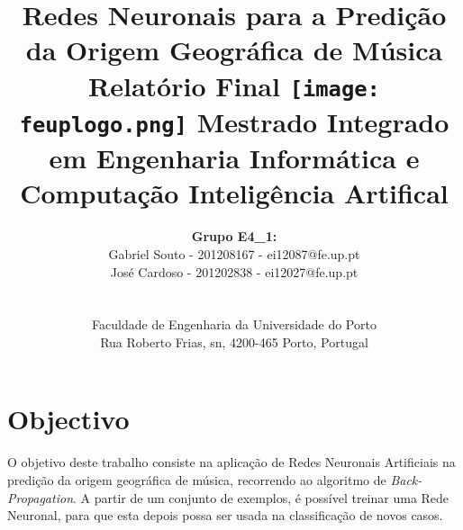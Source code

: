 \documentclass[a4paper]{article}
\begin{document}
\setlength{\textwidth}{16cm}
\setlength{\textheight}{22cm}

\title{\Huge\textbf{Redes Neuronais para a Predição da Origem Geográfica de Música}\linebreak\linebreak\linebreak
\Large\textbf{Relatório Final}\linebreak\linebreak
\linebreak\linebreak
\texttt{[image: feuplogo.png]}\linebreak\linebreak
\linebreak
\Large{Mestrado Integrado em Engenharia Informática e Computação} \linebreak\linebreak
\Large{Inteligência Artifical}\linebreak
}

\author{\textbf{Grupo E4\_1:}\\ Gabriel Souto - 201208167 - ei12087@fe.up.pt \\ José Cardoso - 201202838 - ei12027@fe.up.pt \\\linebreak\linebreak \\
 \\ Faculdade de Engenharia da Universidade do Porto \\ Rua Roberto Frias, s\/n, 4200-465 Porto, Portugal }
\pagebreak


\maketitle
\thispagestyle{empty}


\newpage

\section{Objectivo}

O objetivo deste trabalho consiste na aplicação de Redes Neuronais Artificiais na predição da origem geográfica de música, recorrendo ao algoritmo de \textit{Back-Propagation}.\linebreak
A partir de um conjunto de exemplos, é possível treinar uma Rede Neuronal, para que esta depois possa ser usada na classificação de novos casos.
\end{document}
